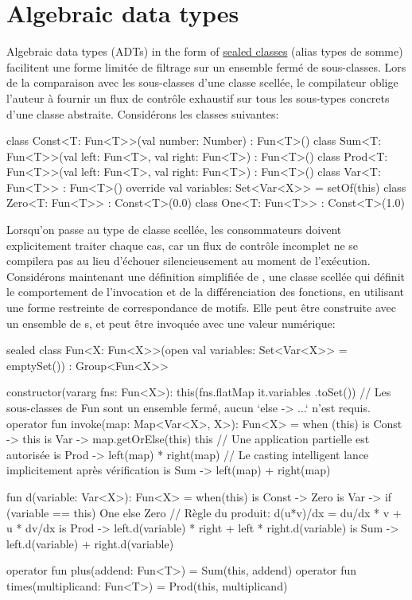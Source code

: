 \section{Algebraic data types}\label{sec:adts}

\noindent Algebraic data types (ADTs) in the form of \href{https://kotlinlang.org/docs/reference/sealed-classes.html}{sealed classes} (alias types de somme) facilitent une forme limitée de filtrage sur un ensemble fermé de sous-classes. Lors de la comparaison avec les sous-classes d'une classe scellée, le compilateur oblige l'auteur à fournir un flux de contrôle exhaustif sur tous les sous-types concrets d'une classe abstraite. Considérons les classes suivantes:
%
\begin{kotlinlisting}
class Const<T: Fun<T>>(val number: Number) : Fun<T>()
class Sum<T: Fun<T>>(val left: Fun<T>, val right: Fun<T>) : Fun<T>()
class Prod<T: Fun<T>>(val left: Fun<T>, val right: Fun<T>) : Fun<T>()
class Var<T: Fun<T>> : Fun<T>() { override val variables: Set<Var<X>> = setOf(this) }
class Zero<T: Fun<T>> : Const<T>(0.0)
class One<T: Fun<T>> : Const<T>(1.0)
\end{kotlinlisting}
%
Lorsqu'on passe au type de classe scellée, les consommateurs doivent explicitement traiter chaque cas, car un flux de contrôle incomplet ne se compilera pas au lieu d'échouer silencieusement au moment de l'exécution. Considérons maintenant une définition simplifiée de , une classe scellée qui définit le comportement de l'invocation et de la différenciation des fonctions, en utilisant une forme restreinte de correspondance de motifs. Elle peut être construite avec un ensemble de s, et peut être invoquée avec une valeur numérique:
%
\begin{kotlinlisting}
sealed class Fun<X: Fun<X>>(open val variables: Set<Var<X>> = emptySet()) : Group<Fun<X>> {
    constructor(vararg fns: Fun<X>): this(fns.flatMap { it.variables }.toSet())
    // Les sous-classes de Fun sont un ensemble fermé, aucun `else -> ...` n'est requis.
    operator fun invoke(map: Map<Var<X>, X>): Fun<X> = when (this) {
        is Const -> this
        is Var -> map.getOrElse(this) { this } // Une application partielle est autorisée
        is Prod -> left(map) * right(map) // Le casting intelligent lance implicitement après vérification
        is Sum -> left(map) + right(map)
    }

    fun d(variable: Var<X>): Fun<X> = when(this) {
        is Const -> Zero
        is Var -> if (variable == this) One else Zero
        // Règle du produit: d(u*v)/dx = du/dx * v + u * dv/dx
        is Prod -> left.d(variable) * right + left * right.d(variable)
        is Sum -> left.d(variable) + right.d(variable)
    }

    operator fun plus(addend: Fun<T>) = Sum(this, addend)
    operator fun times(multiplicand: Fun<T>) = Prod(this, multiplicand)
}
\end{kotlinlisting}
